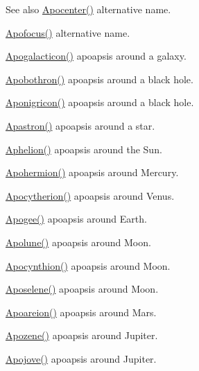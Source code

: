 \begin{DoxySeeAlso}{See also}
\mbox{\hyperlink{group___e_g_x_phys-_apoapsis_gaacffba78614c5b4d5488d8e9b8c661ee}{Apocenter()}} alternative name. 

\mbox{\hyperlink{group___e_g_x_phys-_apoapsis_gada28ef9258703e9e32ac9e564544ae87}{Apofocus()}} alternative name. 

\mbox{\hyperlink{group___e_g_x_phys-_apoapsis_gafef7ad033b39c29cdfe624cd48a6d616}{Apogalacticon()}} apoapsis around a galaxy. 

\mbox{\hyperlink{group___e_g_x_phys-_apoapsis_ga95add3a7ff4e799bff0a508c9bdaa408}{Apobothron()}} apoapsis around a black hole. 

\mbox{\hyperlink{group___e_g_x_phys-_apoapsis_gabceed387c4cdd53b8ccebafe2e8da8e1}{Aponigricon()}} apoapsis around a black hole. 

\mbox{\hyperlink{group___e_g_x_phys-_apoapsis_ga809627c2522d7b4db0f27d6ea89e4f89}{Apastron()}} apoapsis around a star. 

\mbox{\hyperlink{group___e_g_x_phys-_apoapsis_ga31b1bd55ee4ebe33f2af6827bfe30515}{Aphelion()}} apoapsis around the Sun. 

\mbox{\hyperlink{group___e_g_x_phys-_apoapsis_ga50a476b4a3c9be6ded8308a247bf001c}{Apohermion()}} apoapsis around Mercury. 

\mbox{\hyperlink{group___e_g_x_phys-_apoapsis_ga75bd80071f792bd75d609fec8dca17b1}{Apocytherion()}} apoapsis around Venus. 

\mbox{\hyperlink{group___e_g_x_phys-_apoapsis_ga5bb3b3a83de372ffaf9af3ab77d6f408}{Apogee()}} apoapsis around Earth. 

\mbox{\hyperlink{group___e_g_x_phys-_apoapsis_gac82e5aebcf63e5113ddefe648f40ef2e}{Apolune()}} apoapsis around Moon. 

\mbox{\hyperlink{group___e_g_x_phys-_apoapsis_ga44b6d3e3280b5a59e1cfb53b65673075}{Apocynthion()}} apoapsis around Moon. 

\mbox{\hyperlink{group___e_g_x_phys-_apoapsis_gaf13528a3ed48f6e85f4ba5735edc1163}{Aposelene()}} apoapsis around Moon. 

\mbox{\hyperlink{group___e_g_x_phys-_apoapsis_ga8a44d21df90f3e6e9168b871a5b7f26b}{Apoareion()}} apoapsis around Mars. 

\mbox{\hyperlink{group___e_g_x_phys-_apoapsis_ga2de1f63be8e4e22f219c4e947588a207}{Apozene()}} apoapsis around Jupiter. 

\mbox{\hyperlink{group___e_g_x_phys-_apoapsis_gad2a2021d43526fc752fe87beff789b28}{Apojove()}} apoapsis around Jupiter. 


\end{DoxySeeAlso}
